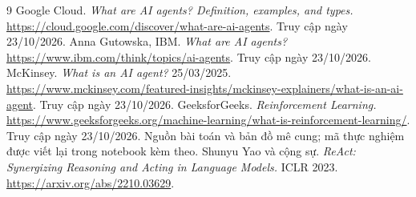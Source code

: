 \documentclass[12pt,a4paper]{report}
\begin{document}
\begin{titlepage}
\null
\end{titlepage}

\begingroup
\renewcommand{\contentsname}{MỤC LỤC}
\small\tableofcontents
\endgroup
\clearpage
{}


\clearpage
{}
\begin{thebibliography}{9}
 Google Cloud. \textit{What are AI agents? Definition, examples, and types.}
\url{https://cloud.google.com/discover/what-are-ai-agents}. Truy cập ngày 23/10/2026.
 Anna Gutowska, IBM. \textit{What are AI agents?}
\url{https://www.ibm.com/think/topics/ai-agents}. Truy cập ngày 23/10/2026.
 McKinsey. \textit{What is an AI agent?} 25/03/2025.
\url{https://www.mckinsey.com/featured-insights/mckinsey-explainers/what-is-an-ai-agent}. Truy cập ngày 23/10/2026.
 GeeksforGeeks. \textit{Reinforcement Learning.}
\url{https://www.geeksforgeeks.org/machine-learning/what-is-reinforcement-learning/}. Truy cập ngày 23/10/2026. Nguồn bài toán và bản đồ mê cung; mã thực nghiệm được viết lại trong notebook kèm theo.
 Shunyu Yao và cộng sự. \textit{ReAct: Synergizing Reasoning and Acting in Language Models.} ICLR 2023.
\url{https://arxiv.org/abs/2210.03629}.
\end{thebibliography}
\end{document}

